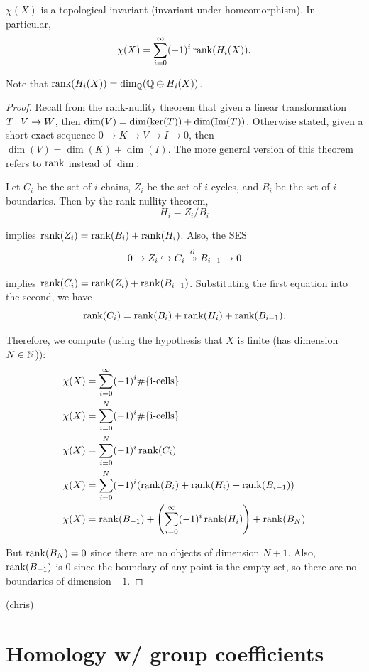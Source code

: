 \documentclass[11pt,leqno,oneside]{amsart}
\newenvironment{dateenv}{
  \vspace{1em}
}{
  \vspace{1em}
}
\newcommand{\mydate}[4]{
  \newdate{#1}{#2}{#3}{#4}
  \begin{dateenv}
    \hfill\displaydate{#1}
  \end{dateenv}
}
\numberwithin{thm}{section}
\renewcommand{\d}{\partial}
\newcommand{\homl}[1][n]{H_{#1}}
\newcommand{\rhoml}[1][n]{\widetilde{H}_{#1}}
\newcommand{\rchains}[1][n]{\widetilde{C}_{#1}}
\begin{document}
\begin{thm}
  $\chi(X)$ is a topological invariant (invariant under homeomorphism).  In particular,
  $$ \chi(X) = \sum_{i=0}^\infty (-1)^i \operatorname{rank}(H_i(X)). $$

  Note that $\operatorname{rank}(H_i(X)) = \dim_{{\mathbb Q}}({\mathbb Q} \oplus H_i(X))$.
\end{thm}
\begin{proof}
  Recall from the rank-nullity theorem that given a linear transformation $T \colon V \to W$, then $\dim(V) = \dim(\ker(T)) + \dim(\operatorname{Im}(T))$.  Otherwise stated, given a short exact sequence $0 \to K \to V \to I \to 0$, then $\dim(V) = \dim(K) + \dim(I)$.  The more general version of this theorem refers to $\operatorname{rank}$ instead of $\dim$.

  Let $C_i$ be the set of $i$-chains, $Z_i$ be the set of $i$-cycles, and $B_i$ be the set of $i$-boundaries.  Then by the rank-nullity theorem,
  $$ H_i = Z_i/B_i $$

  implies $\operatorname{rank}(Z_i) = \operatorname{rank}(B_i) + \operatorname{rank}(H_i)$.  Also, the SES
  $$ 0 \to Z_i \into C_i \overset{\d}{\onto} B_{i-1} \to 0 $$

  implies $\operatorname{rank}(C_i) = \operatorname{rank}(Z_i) + \operatorname{rank}(B_{i-1})$.  Substituting the first equation into the second, we have
  $$ \operatorname{rank}(C_i) = \operatorname{rank}(B_i) + \operatorname{rank}(H_i) + \operatorname{rank}(B_{i-1}).$$

  Therefore, we compute (using the hypothesis that $X$ is finite (has dimension $N \in {\mathbb N}$)):
  \begin{align}
    \chi(X) &= \sum_{i=0}^\infty (-1)^i \#\{\text{i-cells}\} \\
    \chi(X) &= \sum_{i=0}^N (-1)^i \#\{\text{i-cells}\} \\
    \chi(X) &= \sum_{i=0}^N (-1)^i \operatorname{rank}(C_i) \\
    \chi(X) &= \sum_{i=0}^N (-1)^i (\operatorname{rank}(B_i) + \operatorname{rank}(H_i) + \operatorname{rank}(B_{i-1})) \\
    \chi(X) &= \operatorname{rank}(B_{-1}) + \left(\sum_{i=0}^\infty (-1)^i \operatorname{rank}(H_i)\right) + \operatorname{rank}(B_N)
  \end{align}

  But $\operatorname{rank}(B_N) = 0$ since there are no objects of dimension $N+1$.  Also, $\operatorname{rank}(B_{-1})$ is 0 since the boundary of any point is the empty set, so there are no boundaries of dimension $-1$.
\end{proof}

\mydate{dj}{14}{4}{2017}
(chris)

\section*{Homology w/ group coefficients}
\renewcommand{\homl}[1][k]{H_{#1}}
\renewcommand{\rhoml}[1][k]{\widetilde{H}_{#1}}
\renewcommand{\rchains}[1][k]{\widetilde{C}_{#1}}
\end{document}
